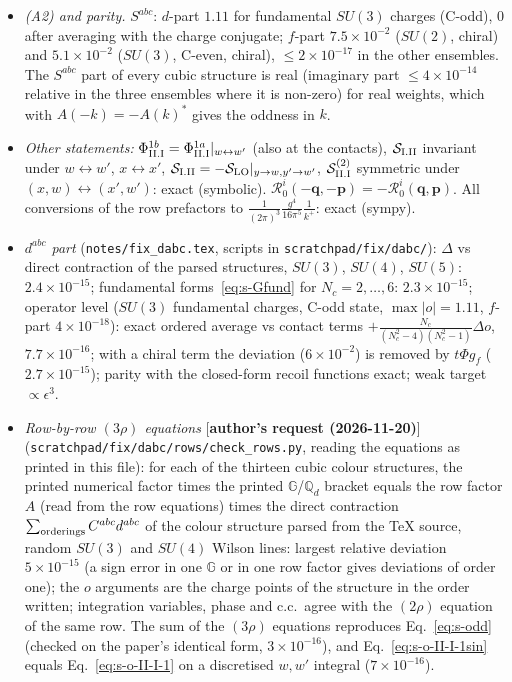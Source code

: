 \documentclass[9pt]{article}
\def\mf#1{\mathbb{#1}}
\numberwithin{equation}{section}
\begin{document}
{\begin{itemize}
\item \emph{(A2) and parity.} $S^{abc}$: $d$-part $1.11$ for fundamental $SU(3)$ charges (C-odd), $0$ after averaging with the charge conjugate; $f$-part $7.5\times10^{-2}$ ($SU(2)$, chiral) and $5.1\times10^{-2}$ ($SU(3)$, C-even, chiral), $\le2\times10^{-17}$ in the other ensembles. The $S^{abc}$ part of every cubic structure is real (imaginary part $\le4\times10^{-14}$ relative in the three ensembles where it is non-zero) for real weights, which with $A(-k)=-A(k)^{*}$ gives the oddness in $k$.
\item \emph{Other statements:} $\Phi^{1b}_{\rm II.I}=\Phi^{1a}_{\rm II.I}|_{w\leftrightarrow w'}$ (also at the contacts), $\mathcal{S}_{\rm I.II}$ invariant under $w\leftrightarrow w'$, $x\leftrightarrow x'$, $\mathcal{S}_{\rm I.II}=-\mathcal{S}_{\rm LO}|_{y\to w,y'\to w'}$, $\mathcal{S}^{(2)}_{\rm II.I}$ symmetric under $(x,w)\leftrightarrow(x',w')$: exact (symbolic). $\mathcal{R}^{i}_{0}(-\mathbf{q},-\mathbf{p})=-\mathcal{R}^{i}_{0}(\mathbf{q},\mathbf{p})$. All conversions of the row prefactors to $\frac{1}{(2\pi)^{3}}\frac{g^{4}}{16\pi^{5}}\frac{1}{k^{+}}$: exact (sympy).
\item \emph{$d^{abc}$ part} (\texttt{notes/fix\_dabc.tex}, scripts in \texttt{scratchpad/fix/dabc/}): $\Delta$ vs direct contraction of the parsed structures, $SU(3)$, $SU(4)$, $SU(5)$: $2.4\times10^{-15}$; fundamental forms~\eqref{eq:s-Gfund} for $N_{c}=2,\dots,6$: $2.3\times10^{-15}$; operator level ($SU(3)$ fundamental charges, C-odd state, $\max|o|=1.11$, $f$-part $4\times10^{-18}$): exact ordered average vs contact terms $+\frac{N_{c}}{(N_{c}^{2}-4)(N_{c}^{2}-1)}\Delta o$, $7.7\times10^{-16}$; with a chiral term the deviation ($6\times10^{-2}$) is removed by $t\Phi g_{f}$ ($2.7\times10^{-15}$); parity with the closed-form recoil functions exact; weak target $\propto\epsilon^{3}$.
\item \emph{Row-by-row $(3\rho)$ equations} [\textbf{author's request (2026-11-20)}] (\texttt{scratchpad/fix/dabc/rows/check\_rows.py}, reading the equations as printed in this file): for each of the thirteen cubic colour structures, the printed numerical factor times the printed $\mf{G}$/$\mf{Q}_{d}$ bracket equals the row factor $A$ (read from the row equations) times the direct contraction $\sum_{\rm orderings}C^{abc}d^{abc}$ of the colour structure parsed from the TeX source, random $SU(3)$ and $SU(4)$ Wilson lines: largest relative deviation $5\times10^{-15}$ (a sign error in one $\mf{G}$ or in one row factor gives deviations of order one); the $o$ arguments are the charge points of the structure in the order written; integration variables, phase and c.c.\ agree with the $(2\rho)$ equation of the same row. The sum of the $(3\rho)$ equations reproduces Eq.~\eqref{eq:s-odd} (checked on the paper's identical form, $3\times10^{-16}$), and Eq.~\eqref{eq:s-o-II-I-1sin} equals Eq.~\eqref{eq:s-o-II-I-1} on a discretised $w,w'$ integral ($7\times10^{-16}$).

\end{itemize}}
\end{document}
